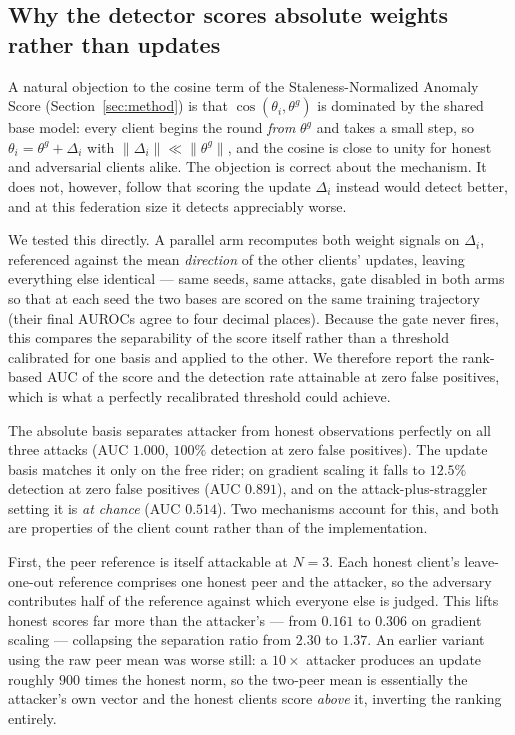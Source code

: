 \documentclass[pdflatex,sn-mathphys-num]{sn-jnl}
\begin{document}
\subsection{Why the detector scores absolute weights rather than updates}\label{sec:basis}

A natural objection to the cosine term of the Staleness-Normalized Anomaly Score (Section~\ref{sec:method}) is that $\cos(\theta_i, \theta^g)$ is dominated by the shared base model: every client begins the round \emph{from} $\theta^g$ and takes a small step, so $\theta_i = \theta^g + \Delta_i$ with $\lVert\Delta_i\rVert \ll \lVert\theta^g\rVert$, and the cosine is close to unity for honest and adversarial clients alike. The objection is correct about the mechanism. It does not, however, follow that scoring the update $\Delta_i$ instead would detect better, and at this federation size it detects appreciably worse.

We tested this directly. A parallel arm recomputes both weight signals on $\Delta_i$, referenced against the mean \emph{direction} of the other clients' updates, leaving everything else identical --- same seeds, same attacks, gate disabled in both arms so that at each seed the two bases are scored on the same training trajectory (their final AUROCs agree to four decimal places). Because the gate never fires, this compares the separability of the score itself rather than a threshold calibrated for one basis and applied to the other. We therefore report the rank-based AUC of the score and the detection rate attainable at zero false positives, which is what a perfectly recalibrated threshold could achieve.

The absolute basis separates attacker from honest observations perfectly on all three attacks (AUC $1.000$, $100\%$ detection at zero false positives). The update basis matches it only on the free rider; on gradient scaling it falls to $12.5\%$ detection at zero false positives (AUC $0.891$), and on the attack-plus-straggler setting it is \emph{at chance} (AUC $0.514$). Two mechanisms account for this, and both are properties of the client count rather than of the implementation.

First, the peer reference is itself attackable at $N=3$. Each honest client's leave-one-out reference comprises one honest peer and the attacker, so the adversary contributes half of the reference against which everyone else is judged. This lifts honest scores far more than the attacker's --- from $0.161$ to $0.306$ on gradient scaling --- collapsing the separation ratio from $2.30$ to $1.37$. An earlier variant using the raw peer mean was worse still: a $10\times$ attacker produces an update roughly $900$ times the honest norm, so the two-peer mean is essentially the attacker's own vector and the honest clients score \emph{above} it, inverting the ranking entirely.
\end{document}
